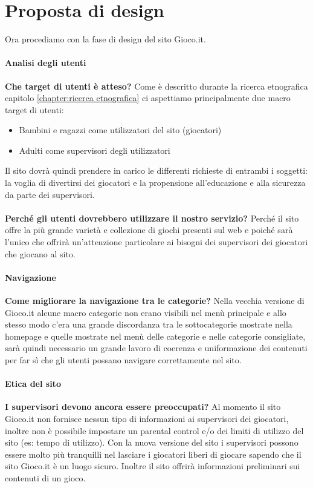 \documentclass[../Report.tex]{subfiles}
\begin{document}
    \chapter{Proposta di design}
    Ora procediamo con la fase di design del sito Gioco.it.
    \subsubsection{Analisi degli utenti}
    \textbf{Che target di utenti è atteso?} Come è descritto durante la ricerca etnografica capitolo \ref{chapter:ricerca etnografica} ci aspettiamo principalmente due macro target di utenti:
    \begin{itemize}
        \item Bambini e ragazzi come utilizzatori del sito (giocatori)
        \item Adulti come supervisori degli utilizzatori 
    \end{itemize}

    Il sito dovrà quindi prendere in carico le differenti richieste di entrambi i soggetti: la voglia di divertirsi dei giocatori e la propensione all'educazione e alla sicurezza da parte dei supervisori.\\
    \\
    \textbf{Perché gli utenti dovrebbero utilizzare il nostro servizio?} Perché il sito offre la più grande varietà e collezione di giochi presenti sul web e poiché sarà l'unico che offrirà un'attenzione particolare ai bisogni dei supervisori dei giocatori che giocano al sito.

    \subsubsection{Navigazione}
    \textbf{Come migliorare la navigazione tra le categorie?} Nella vecchia versione di Gioco.it alcune macro categorie non erano visibili nel menù principale e allo stesso modo c'era una grande discordanza tra le sottocategorie mostrate nella homepage e quelle mostrate nel menù delle categorie e nelle categorie consigliate, sarà quindi necessario un grande lavoro di coerenza e uniformazione dei contenuti per far sì che gli utenti possano navigare correttamente nel sito.

    \subsubsection{Etica del sito}
    \textbf{I supervisori devono ancora essere preoccupati?} Al momento il sito Gioco.it non fornisce nessun tipo di informazioni ai supervisori dei giocatori, inoltre non è possibile impostare un parental control e/o dei limiti di utilizzo del sito (es: tempo di utilizzo). Con la nuova versione del sito i supervisori possono essere molto più tranquilli nel lasciare i giocatori liberi di giocare sapendo che il sito Gioco.it è un luogo sicuro. Inoltre il sito offrirà informazioni preliminari sui contenuti di un gioco.
\end{document}
